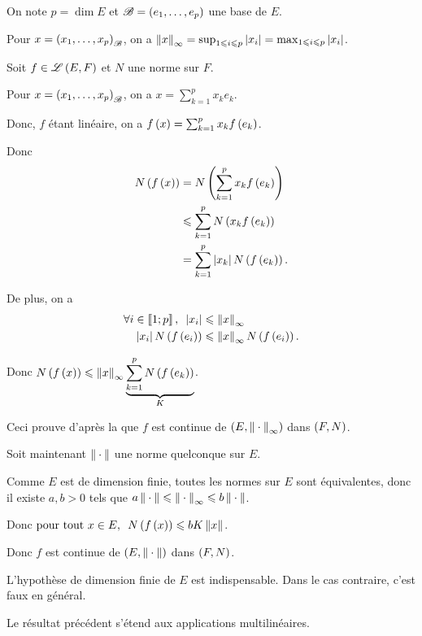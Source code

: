\begin{dem}
On note \(p=\dim E\) et \(\mathscr{B}=\left(e_1,\dots,e_p\right)\) une base de \(E\).

Pour \(x=\left(x_1,\dots,x_p\right)_{\mathscr{B}}\), on a \(\norme{x}_\infty=\sup_{1\leq i\leq p}\abs{x_i}=\max_{1\leq i\leq p}\abs{x_i}\).

Soit \(f\in\mathscr{L}\left(E,F\right)\) et \(N\) une norme sur \(F\).

Pour \(x=\left(x_1,\dots,x_p\right)_{\mathscr{B}}\), on a \(x=\sum_{k=1}^px_ke_k\).

Donc, \(f\) étant linéaire, on a \(f\left(x\right)=\sum_{k=1}^px_kf\left(e_k\right)\).

Donc \[\begin{aligned}
N\left(f\left(x\right)\right)&=N\left(\sum_{k=1}^px_kf\left(e_k\right)\right) \\
&\leqslant\sum_{k=1}^pN\left(x_kf\left(e_k\right)\right) \\
&=\sum_{k=1}^p\left\lvert x_k\right\rvert N\left(f\left(e_k\right)\right).
\end{aligned}\]

De plus, on a \[\begin{aligned}
\quantifs{\forall i\in\interventierii{1}{p}}\abs{x_i}&\leq\norme{x}_\infty \\
\abs{x_i}N\paren{f\paren{e_i}}&\leq\norme{x}_\infty N\paren{f\paren{e_i}}.
\end{aligned}\]

Donc \(N\paren{f\paren{x}}\leq\norme{x}_\infty\underbrace{\sum_{k=1}^pN\paren{f\paren{e_k}}}_{K}\).

Ceci prouve d'après la  que \(f\) est continue de \(\groupe{E}[\norme{}_\infty]\) dans \(\groupe{F}[N]\).

Soit maintenant \(\norme{}\) une norme quelconque sur \(E\).

Comme \(E\) est de dimension finie, toutes les normes sur \(E\) sont équivalentes, donc il existe \(a,b>0\) tels que \(a\norme{}\leq\norme{}_\infty\leq b\norme{}\).

Donc \(\quantifs{\tpt x\in E}N\paren{f\paren{x}}\leq bK\norme{x}\).

Donc \(f\) est continue de \(\groupe{E}[\norme{}]\) dans \(\groupe{F}[N]\).
\end{dem}

\begin{rem}
L'hypothèse de dimension finie de \(E\) est indispensable. Dans le cas contraire, c'est faux en général.
\end{rem}

Le résultat précédent s'étend aux applications multilinéaires.

